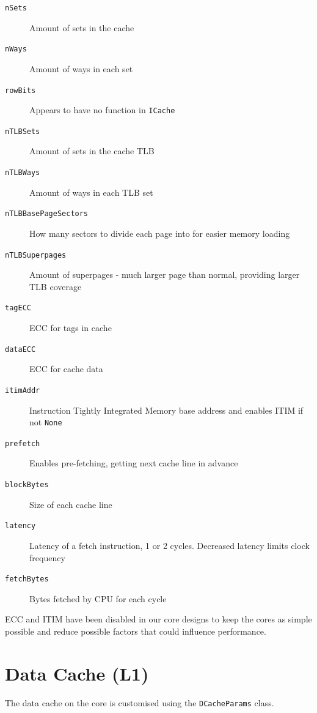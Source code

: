 \begin{description}
    \item[\texttt{nSets}] Amount of sets in the cache
    \item[\texttt{nWays}] Amount of ways in each set
    \item[\texttt{rowBits}] Appears to have no function in \texttt{ICache}
    \item[\texttt{nTLBSets}] Amount of sets in the cache TLB
    \item[\texttt{nTLBWays}] Amount of ways in each TLB set
    \item[\texttt{nTLBBasePageSectors}] How many sectors to divide each page into for easier memory loading
    \item[\texttt{nTLBSuperpages}] Amount of superpages - much larger page than normal, providing larger TLB coverage
    \item[\texttt{tagECC}] ECC for tags in cache
    \item[\texttt{dataECC}] ECC for cache data
    \item[\texttt{itimAddr}] Instruction Tightly Integrated Memory base address and enables ITIM if not \texttt{None}
    \item[\texttt{prefetch}] Enables pre-fetching, getting next cache line in advance
    \item[\texttt{blockBytes}] Size of each cache line
    \item[\texttt{latency}] Latency of a fetch instruction, 1 or 2 cycles. Decreased latency limits clock frequency
    \item[\texttt{fetchBytes}] Bytes fetched by CPU for each cycle
\end{description}

ECC and ITIM have been disabled in our core designs to keep the cores as simple possible and reduce possible factors that could influence performance.

\section{Data Cache (L1)}
The data cache on the core is customised using the \texttt{DCacheParams} class.

